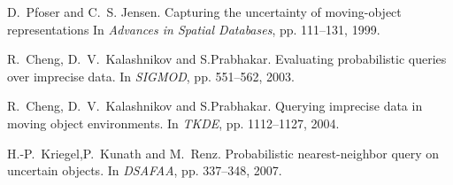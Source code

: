 \begin{frame}[allowframebreaks]
\begin{thebibliography}{99}
{
D.~Pfoser and C.~S. Jensen.
\newblock Capturing the uncertainty of moving-object representations
\newblock In {\em Advances in Spatial Databases}, pp. 111--131, 1999.

R.~Cheng, D.~V.~Kalashnikov and S.Prabhakar.
\newblock Evaluating probabilistic queries over imprecise data.
\newblock In {\em SIGMOD}, pp. 551--562, 2003.

R.~Cheng, D.~V.~Kalashnikov and S.Prabhakar.
\newblock Querying imprecise data in moving object environments.
\newblock In {\em TKDE}, pp. 1112--1127, 2004.

H.-P.~Kriegel,P.~Kunath and M.~Renz.
\newblock Probabilistic nearest-neighbor query on uncertain objects.
\newblock In {\em DSAFAA}, pp. 337--348, 2007.

}
\end{thebibliography}

\end{frame}
